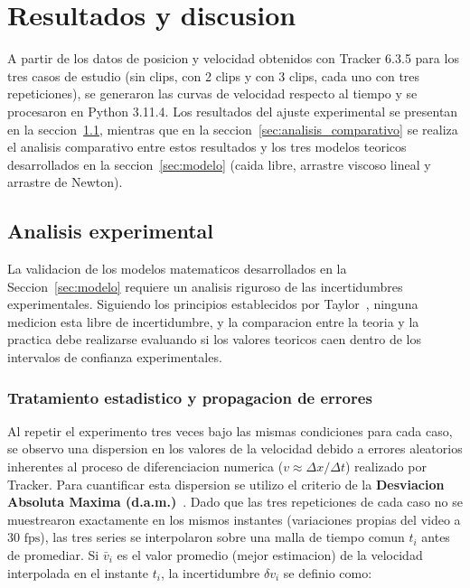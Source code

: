 \section{Resultados y discusion}\label{sec:resultados}

A partir de los datos de posicion y velocidad obtenidos con Tracker 6.3.5 para
los tres casos de estudio (sin clips, con 2 clips y con 3 clips, cada uno con
tres repeticiones), se generaron las curvas de velocidad respecto al tiempo
y se procesaron en Python 3.11.4. Los resultados del ajuste experimental se
presentan en la seccion~\ref{sec:ajuste_experimental}, mientras que en la
seccion~\ref{sec:analisis_comparativo} se realiza el analisis comparativo
entre estos resultados y los tres modelos teoricos desarrollados en la
seccion~\ref{sec:modelo} (caida libre, arrastre viscoso lineal y arrastre de
Newton).

\subsection{Analisis experimental}\label{sec:ajuste_experimental}

La validacion de los modelos matematicos desarrollados en la
Seccion~\ref{sec:modelo} requiere un analisis riguroso de las incertidumbres
experimentales. Siguiendo los principios establecidos por
Taylor~\cite{taylor1997}, ninguna medicion esta libre de incertidumbre, y la
comparacion entre la teoria y la practica debe realizarse evaluando si los
valores teoricos caen dentro de los intervalos de confianza experimentales.

\subsubsection{Tratamiento estadistico y propagacion de errores}

Al repetir el experimento tres veces bajo las mismas condiciones para cada
caso, se observo una dispersion en los valores de la velocidad debido a
errores aleatorios inherentes al proceso de diferenciacion numerica
($v \approx \Delta x/\Delta t$) realizado por Tracker. Para cuantificar esta
dispersion se utilizo el criterio de la \textbf{Desviacion Absoluta Maxima
(d.a.m.)}~\cite{manualgrafico}. Dado que las tres repeticiones de cada caso
no se muestrearon exactamente en los mismos instantes (variaciones propias
del video a $30\text{ fps}$), las tres series se interpolaron sobre una
malla de tiempo comun $t_i$ antes de promediar. Si $\bar{v}_i$ es el valor
promedio (mejor estimacion) de la velocidad interpolada en el instante
$t_i$, la incertidumbre $\delta v_i$ se definio como:

